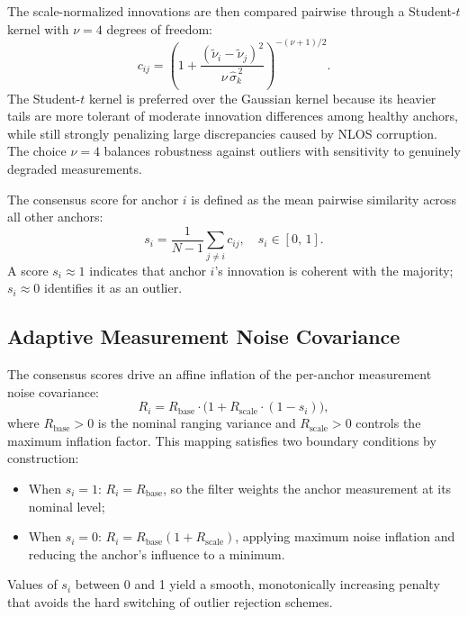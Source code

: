 \documentclass[journal]{IEEEtran}
\begin{document}
The scale-normalized innovations are then compared pairwise through a Student-$t$ kernel with $\nu = 4$ degrees of freedom:
\begin{equation}\label{eq:kernel}
    c_{ij} = \left(1 + \frac{(\tilde{\nu}_i - \tilde{\nu}_j)^2}{\nu\, \widehat{\sigma}_k^{\,2}}\right)^{-(\nu+1)/2}.
\end{equation}
The Student-$t$ kernel is preferred over the Gaussian kernel because its heavier tails are more tolerant of moderate innovation differences among healthy anchors, while still strongly penalizing large discrepancies caused by NLOS corruption. The choice $\nu = 4$ balances robustness against outliers with sensitivity to genuinely degraded measurements.

The consensus score for anchor $i$ is defined as the mean pairwise similarity across all other anchors:
\begin{equation}\label{eq:score}
    s_i = \frac{1}{N-1}\sum_{j \neq i} c_{ij}, \quad s_i \in [0,\, 1].
\end{equation}
A score $s_i \approx 1$ indicates that anchor $i$'s innovation is coherent with the majority; $s_i \approx 0$ identifies it as an outlier.

\subsection{Adaptive Measurement Noise Covariance}

The consensus scores drive an affine inflation of the per-anchor measurement noise covariance:
\begin{equation}\label{eq:adaptive_R}
    R_i = R_{\text{base}} \cdot \bigl(1 + R_{\text{scale}} \cdot (1 - s_i)\bigr),
\end{equation}
where $R_{\text{base}} > 0$ is the nominal ranging variance and $R_{\text{scale}} > 0$ controls the maximum inflation factor. This mapping satisfies two boundary conditions by construction:
\begin{itemize}
    \item When $s_i = 1$: $R_i = R_{\text{base}}$, so the filter weights the anchor measurement at its nominal level;
    \item When $s_i = 0$: $R_i = R_{\text{base}}(1 + R_{\text{scale}})$, applying maximum noise inflation and reducing the anchor's influence to a minimum.
\end{itemize}
Values of $s_i$ between 0 and 1 yield a smooth, monotonically increasing penalty that avoids the hard switching of outlier rejection schemes.
\end{document}
